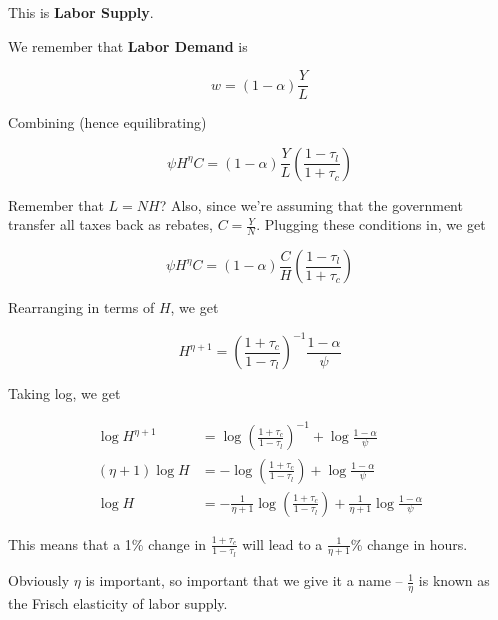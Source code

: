 \documentclass[11pt]{scrartcl}
\begin{document}
This is \textbf{Labor Supply}.

We remember that \textbf{Labor Demand} is

\[ w = (1-\alpha)\frac{Y}{L}\]

Combining (hence equilibrating)

\[ \psi H^\eta C = (1-\alpha)\frac{Y}{L} \left(\frac{1-\tau_l}{1+\tau_c}\right) \]

Remember that $L=NH$? Also, since we're assuming that the government transfer all taxes back as rebates, $C = \frac{Y}{N}$. Plugging these conditions in, we get

\[ \psi H^\eta C = (1-\alpha)\frac{C}{H} \left(\frac{1-\tau_l}{1+\tau_c}\right) \]

Rearranging in terms of $H$, we get

\[H^{\eta+1} = \left(\frac{1+\tau_c}{1-\tau_l}\right)^{-1} \frac{1-\alpha}{\psi}\]

Taking log, we get

\begin{align*}
\log{H^{\eta+1}} &= \log{\left(\frac{1+\tau_c}{1-\tau_l}\right)^{-1}} + \log{\frac{1-\alpha}{\psi}} \\
(\eta +1) \log{H} &= -\log{\left(\frac{1+\tau_c}{1-\tau_l}\right)} + \log{\frac{1-\alpha}{\psi}} \\
\log{H} &= -\frac{1}{\eta+1}\log{\left(\frac{1+\tau_c}{1-\tau_l}\right)} + \frac{1}{\eta+1}\log{\frac{1-\alpha}{\psi}}
\end{align*}

This means that a 1\% change in $\frac{1+\tau_c}{1-\tau_l}$ will lead to a $\frac{1}{\eta+1}$\% change in hours. 

Obviously $\eta$ is important, so important that we give it a name -- $\frac{1}{\eta}$ is known as the Frisch elasticity of labor supply.
\end{document}
